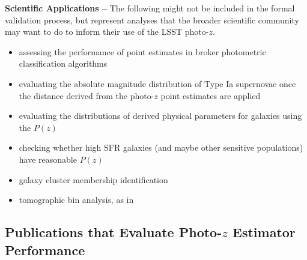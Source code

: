 \documentclass[DM,lsstdraft,toc]{lsstdoc}
\begin{document}
{\bf Scientific Applications --} 
The following might not be included in the formal validation process, but represent analyses that the broader scientific community may want to do to inform their use of the LSST photo-$z$.
\vspace{-15pt}
\begin{itemize}
\item assessing the performance of point estimates in broker photometric classification algorithms
\item evaluating the absolute magnitude distribution of Type Ia supernovae once the distance derived from the photo-$z$ point estimates are applied
\item evaluating the distributions of derived physical parameters for galaxies using the $P(z)$
\item checking whether high SFR galaxies (and maybe other sensitive populations) have reasonable $P(z)$
\item galaxy cluster membership identification
\item tomographic bin analysis, as in \citep{2019MNRAS.482.2807C}
\end{itemize}


\subsection{Publications that Evaluate Photo-$z$ Estimator Performance}\label{ssec:imp_evalpubs}
\end{document}
